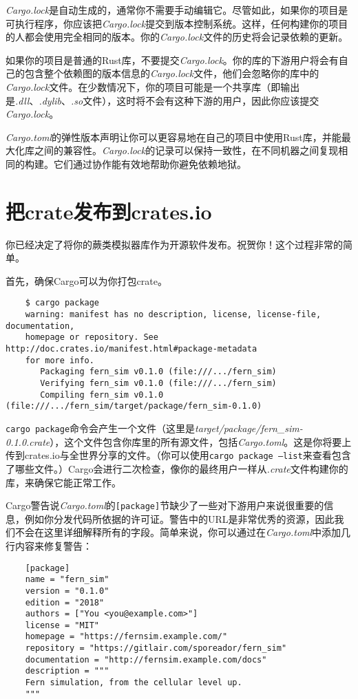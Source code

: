 \emph{Cargo.lock}是自动生成的，通常你不需要手动编辑它。尽管如此，如果你的项目是可执行程序，你应该把\emph{Cargo.lock}提交到版本控制系统。这样，任何构建你的项目的人都会使用完全相同的版本。你的\emph{Cargo.lock}文件的历史将会记录依赖的更新。

如果你的项目是普通的Rust库，不要提交\emph{Cargo.lock}。你的库的下游用户将会有自己的包含整个依赖图的版本信息的\emph{Cargo.lock}文件，他们会忽略你的库中的\emph{Cargo.lock}文件。在少数情况下，你的项目可能是一个共享库（即输出是\emph{.dll}、\emph{.dylib}、\emph{.so}文件），这时将不会有这种下游的用户，因此你应该提交\emph{Cargo.lock}。

\emph{Cargo.toml}的弹性版本声明让你可以更容易地在自己的项目中使用Rust库，并能最大化库之间的兼容性。\emph{Cargo.lock}的记录可以保持一致性，在不同机器之间复现相同的构建。它们通过协作能有效地帮助你避免依赖地狱。

\section{把crate发布到crates.io}

你已经决定了将你的蕨类模拟器库作为开源软件发布。祝贺你！这个过程非常的简单。

首先，确保Cargo可以为你打包crate。

\begin{verbatim}
    $ cargo package
    warning: manifest has no description, license, license-file, documentation,
    homepage or repository. See http://doc.crates.io/manifest.html#package-metadata
    for more info.
       Packaging fern_sim v0.1.0 (file:///.../fern_sim)
       Verifying fern_sim v0.1.0 (file:///.../fern_sim)
       Compiling fern_sim v0.1.0 (file:///.../fern_sim/target/package/fern_sim-0.1.0)
\end{verbatim}

\texttt{cargo package}命令会产生一个文件（这里是\emph{target/package/fern\_sim-0.1.0.crate}），这个文件包含你库里的所有源文件，包括\emph{Cargo.toml}。这是你将要上传到crates.io与全世界分享的文件。（你可以使用\texttt{cargo package --list}来查看包含了哪些文件。）Cargo会进行二次检查，像你的最终用户一样从\emph{.crate}文件构建你的库，来确保它能正常工作。

Cargo警告说\emph{Cargo.toml}的\texttt{[package]}节缺少了一些对下游用户来说很重要的信息，例如你分发代码所依据的许可证。警告中的URL是非常优秀的资源，因此我们不会在这里详细解释所有的字段。简单来说，你可以通过在\emph{Cargo.toml}中添加几行内容来修复警告：
\begin{verbatim}
    [package]
    name = "fern_sim"
    version = "0.1.0"
    edition = "2018"
    authors = ["You <you@example.com>"]
    license = "MIT"
    homepage = "https://fernsim.example.com/"
    repository = "https://gitlair.com/sporeador/fern_sim"
    documentation = "http://fernsim.example.com/docs"
    description = """
    Fern simulation, from the cellular level up.
    """
\end{verbatim}


